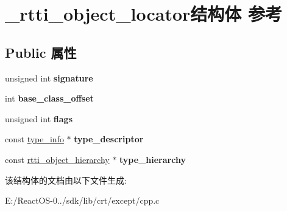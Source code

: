 \hypertarget{struct__rtti__object__locator}{}\section{\+\_\+rtti\+\_\+object\+\_\+locator结构体 参考}
\label{struct__rtti__object__locator}
\subsection*{Public 属性}
\begin{DoxyCompactItemize}
\item 
\mbox{\label{struct__rtti__object__locator_a5f1e4b0601c955f1700ef669b121f898}} 
unsigned int {\bfseries signature}
\item 
\mbox{\label{struct__rtti__object__locator_a653838dbef8c6c6309447046a718df65}} 
int {\bfseries base\+\_\+class\+\_\+offset}
\item 
\mbox{\label{struct__rtti__object__locator_a1f39d1fc457d0efe81c50d1fc5e52d27}} 
unsigned int {\bfseries flags}
\item 
\mbox{\label{struct__rtti__object__locator_a0eebbdbd83b9703a7320ffa8affcb471}} 
const \hyperlink{struct____type__info}{type\+\_\+info} $\ast$ {\bfseries type\+\_\+descriptor}
\item 
\mbox{\label{struct__rtti__object__locator_accc9a035c2c5dec7252396b6971805b7}} 
const \hyperlink{struct__rtti__object__hierarchy}{rtti\+\_\+object\+\_\+hierarchy} $\ast$ {\bfseries type\+\_\+hierarchy}
\end{DoxyCompactItemize}


该结构体的文档由以下文件生成\+:\begin{DoxyCompactItemize}
\item 
E\+:/\+React\+O\+S-\/0../sdk/lib/crt/except/cpp.\+c\end{DoxyCompactItemize}
